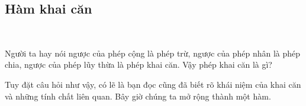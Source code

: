 \subsection{Hàm khai căn}

\ %

Người ta hay nói ngược của phép cộng là phép trừ, ngược của phép nhân là phép chia, ngược của phép lũy thừa là phép khai căn. Vậy phép khai căn là gì?

Tuy đặt câu hỏi như vậy, có lẽ là bạn đọc cũng đã biết rõ khái niệm của khai căn và những tính chất liên quan. Bây giờ chúng ta mở rộng thành một hàm. 
